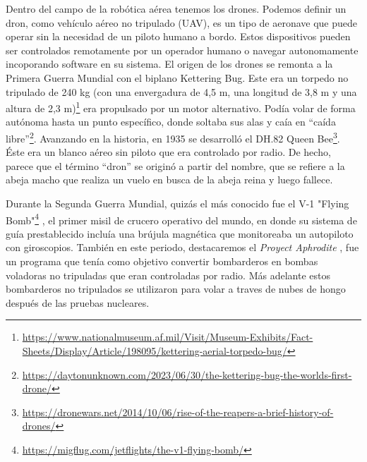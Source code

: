 Dentro del campo de la robótica aérea tenemos los drones. Podemos definir un dron, como vehículo aéreo no tripulado (UAV), es un tipo de aeronave que puede operar sin la 
necesidad de un piloto humano a bordo. Estos dispositivos pueden ser controlados remotamente por un operador humano o navegar autonomamente incoporando software 
en su sistema. 
El origen de los drones se remonta a la Primera Guerra Mundial con el biplano Kettering Bug.
Este era un torpedo no tripulado de 240 kg (con una envergadura de 4,5 m, una longitud de
3,8 m y una altura de 2,3 m)\footnote{\url{https://www.nationalmuseum.af.mil/Visit/Museum-Exhibits/Fact-Sheets/Display/Article/198095/kettering-aerial-torpedo-bug/}} era propulsado por un motor alternativo. Podía volar de
forma autónoma hasta un punto específico, donde soltaba sus alas y caía en “caída libre”\footnote{\url{https://daytonunknown.com/2023/06/30/the-kettering-bug-the-worlds-first-drone/}}.
Avanzando en la historia, en 1935 se desarrolló el DH.82 Queen Bee\footnote{\url{https://dronewars.net/2014/10/06/rise-of-the-reapers-a-brief-history-of-drones/}}. Éste era un blanco aéreo sin piloto que era controlado por radio. De hecho, parece que el término “dron” se originó a partir del nombre, que se refiere a la abeja macho que realiza un vuelo en busca de la abeja reina y luego fallece. \newline

Durante la Segunda Guerra Mundial, quizás el más conocido fue el V-1 "Flying Bomb"\footnote{\url{https://migflug.com/jetflights/the-v1-flying-bomb/}} , el primer misil
de crucero operativo del mundo, en donde su sistema de guía prestablecido incluía una brújula magnética que monitoreaba un autopiloto con giroscopios. También en este periodo, destacaremos el \textit{Proyect Aphrodite} \cite{Aphrodite}, fue un programa que tenía como objetivo convertir bombarderos en bombas voladoras no tripuladas que eran controladas por radio. Más adelante estos bombarderos no tripulados se utilizaron para volar a traves de nubes de hongo
después de las pruebas nucleares. \newline

